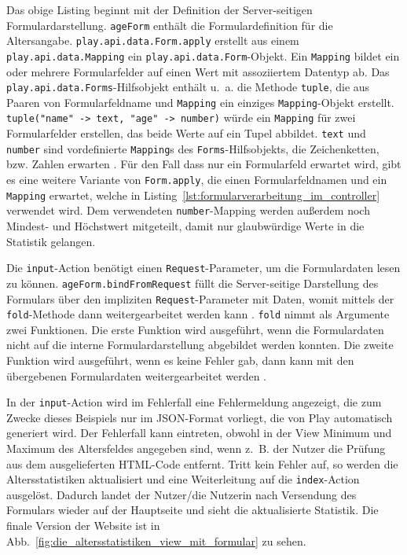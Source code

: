 Das obige Listing beginnt mit der Definition der Server-seitigen Formulardarstellung.
\lstinline|ageForm| enthält die Formulardefinition für die Altersangabe.
\lstinline|play.api.data.Form.apply| erstellt aus einem \lstinline|play.api.data.Mapping| ein \lstinline|play.api.data.Form|-Objekt.
Ein \lstinline|Mapping| bildet ein oder mehrere Formularfelder auf einen Wert mit assoziiertem Datentyp ab.
Das \lstinline|play.api.data.Forms|-Hilfsobjekt enthält u.~a. die Methode \lstinline|tuple|, die aus Paaren von Formularfeldname und \lstinline|Mapping| ein einziges \lstinline|Mapping|-Objekt erstellt.
\lstinline|tuple("name" -> text, "age" -> number)| würde ein \lstinline|Mapping| für zwei Formularfelder erstellen, das beide Werte auf ein Tupel abbildet.
\lstinline|text| und \lstinline|number| sind vordefinierte \lstinline|Mapping|s des \lstinline|Forms|-Hilfsobjekts, die Zeichenketten, bzw. Zahlen erwarten \cite[vgl.][S~217--219]{play_for_scala_v8}.
Für den Fall dass nur ein Formularfeld erwartet wird, gibt es eine weitere Variante von \lstinline|Form.apply|, die einen Formularfeldnamen und ein \lstinline|Mapping| erwartet, welche in Listing~\ref{lst:formularverarbeitung_im_controller} verwendet wird.
Dem verwendeten \lstinline|number|-Mapping werden außerdem noch Mindest- und Höchstwert mitgeteilt, damit nur glaubwürdige Werte in die Statistik gelangen.

Die \lstinline|input|-Action benötigt einen \lstinline|Request|-Parameter, um die Formulardaten lesen zu können.
\lstinline|ageForm.bindFromRequest| füllt die Server-seitige Darstellung des Formulars über den impliziten \lstinline|Request|-Parameter mit Daten, womit mittels der \lstinline|fold|-Methode dann weitergearbeitet werden kann \cite[vgl.][S.~223--224]{play_for_scala_v8}.
\lstinline|fold| nimmt als Argumente zwei Funktionen.
Die erste Funktion wird ausgeführt, wenn die Formulardaten nicht auf die interne Formulardarstellung abgebildet werden konnten.
Die zweite Funktion wird ausgeführt, wenn es keine Fehler gab, dann kann mit den übergebenen Formulardaten weitergearbeitet werden \cite[vgl.][S.~219--220]{play_for_scala_v8}.

In der \lstinline|input|-Action wird im Fehlerfall eine Fehlermeldung angezeigt, die zum Zwecke dieses Beispiels nur im JSON-Format vorliegt, die von Play automatisch generiert wird.
Der Fehlerfall kann eintreten, obwohl in der View Minimum und Maximum des Altersfeldes angegeben sind, wenn z.~B. der Nutzer die Prüfung aus dem ausgelieferten HTML-Code entfernt.
Tritt kein Fehler auf, so werden die Altersstatistiken aktualisiert und eine Weiterleitung auf die \lstinline|index|-Action ausgelöst.
Dadurch landet der Nutzer/die Nutzerin nach Versendung des Formulars wieder auf der Hauptseite und sieht die aktualisierte Statistik.
Die finale Version der Website ist in Abb.~\ref{fig:die_altersstatistiken_view_mit_formular} zu sehen.

